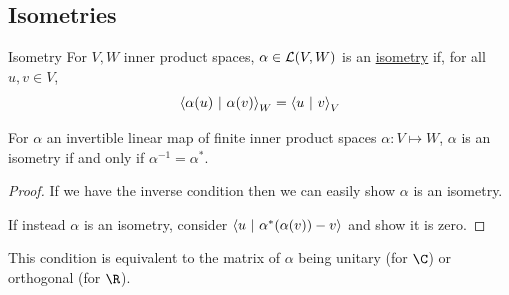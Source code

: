 \documentclass[../Main.tex]{subfiles}
\begin{document}
\subsection{Isometries}
\begin{definition}{Isometry}
    For $V, W$ inner product spaces, $\alpha\in \mathcal{L}(V, W)$ is an \underline{isometry} if, for all $u, v \in V$,
    \begin{equation*}
        \left\langle \alpha(u)~\vert~\alpha(v)\right\rangle_W = \left\langle u~\vert~v\right\rangle_V
    \end{equation*}
\end{definition}
\begin{proposition}
    For $\alpha$ an invertible linear map of finite inner product spaces $\alpha : V \mapsto W$, $\alpha$ is an isometry if and only if $\alpha^{-1} = \alpha^*$.
    \label{propIsomIffInverseAdj}
\end{proposition}
\begin{proof}
    If we have the inverse condition then we can easily show $\alpha$ is an isometry.

    If instead $\alpha$ is an isometry, consider $\left\langle u~\vert~\alpha^*(\alpha(v)) - v\right\rangle$ and show it is zero.
\end{proof}
This condition is equivalent to the matrix of $\alpha$ being unitary (for $\C$) or orthogonal (for $\R$).
\end{document}
